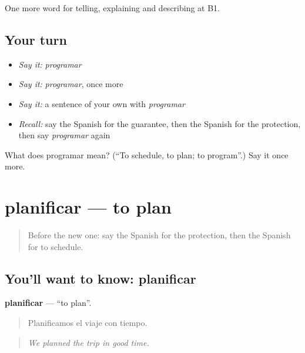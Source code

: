 \begin{grammarlens}[title={What you've built}]
One more word for telling, explaining and describing at B1.
\end{grammarlens}

\subsection*{Your turn}
\begin{itemize}
\raggedright
  \item \emph{Say it:} \emph{programar}
  \item \emph{Say it:} \emph{programar}, once more
  \item \emph{Say it:} a sentence of your own with \emph{programar}
  \item \emph{Recall:} say the Spanish for the guarantee, then the Spanish for the protection, then say \emph{programar} again
\end{itemize}

\begin{tcolorbox}[breakable,colback=teal!4,colframe=teal!35!black,title={Before you move on}]
What does programar mean? (\textquotedblleft{}To schedule, to plan; to program\textquotedblright{}.) Say it once more.
\end{tcolorbox}
\section[planificar]{planificar — to plan}

\label{lesson:ES-C615-planificar}



\begin{quote}
Before the new one: say the Spanish for the protection, then the Spanish for to schedule.
\end{quote}

\subsection*{You'll want to know: planificar}
\textbf{planificar} — \textquotedblleft{}to plan\textquotedblright{}.

\begin{quote}
Planificamos el viaje con tiempo.
\end{quote}

\begin{quote}
\emph{We planned the trip in good time.}
\end{quote}

